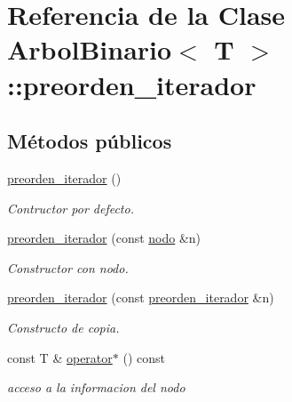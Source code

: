 \hypertarget{classArbolBinario_1_1preorden__iterador}{}\section{Referencia de la Clase Arbol\+Binario$<$ T $>$\+:\+:preorden\+\_\+iterador}
\label{classArbolBinario_1_1preorden__iterador}
\subsection*{Métodos públicos}
\begin{DoxyCompactItemize}
\item 
\mbox{\label{classArbolBinario_1_1preorden__iterador_a487be2b709b98ae509530648d528df28}} 
\hyperlink{classArbolBinario_1_1preorden__iterador_a487be2b709b98ae509530648d528df28}{preorden\+\_\+iterador} ()
\begin{DoxyCompactList}\small\item\em Contructor por defecto. \end{DoxyCompactList}\item 
\hyperlink{classArbolBinario_1_1preorden__iterador_a1f65086e56a315eea9b1ed0482b42709}{preorden\+\_\+iterador} (const \hyperlink{classArbolBinario_1_1nodo}{nodo} \&n)
\begin{DoxyCompactList}\small\item\em Constructor con nodo. \end{DoxyCompactList}\item 
\hyperlink{classArbolBinario_1_1preorden__iterador_a5986920ce2e2e8b86e1a32fcc831161d}{preorden\+\_\+iterador} (const \hyperlink{classArbolBinario_1_1preorden__iterador}{preorden\+\_\+iterador} \&n)
\begin{DoxyCompactList}\small\item\em Constructo de copia. \end{DoxyCompactList}\item 
\mbox{\label{classArbolBinario_1_1preorden__iterador_a0a274b3660799bd0e3eb210e30489d63}} 
const T \& \hyperlink{classArbolBinario_1_1preorden__iterador_a0a274b3660799bd0e3eb210e30489d63}{operator$\ast$} () const
\begin{DoxyCompactList}\small\item\em acceso a la informacion del nodo \end{DoxyCompactList}\item 

\end{DoxyCompactItemize}

